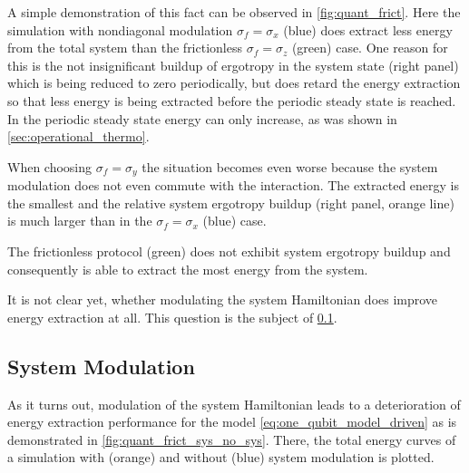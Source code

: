 A simple demonstration of this fact can be observed in
\cref{fig:quant_frict}. Here the simulation with nondiagonal
modulation \(σ_{f}=σ_{x}\) (blue) does extract less energy from the
total system than the frictionless \(σ_{f}=σ_{z}\) (green) case. One
reason for this is the not insignificant buildup of ergotropy in the
system state (right panel) which is being reduced to zero
periodically, but does retard the energy extraction so that less
energy is being extracted before the periodic steady state is
reached. In the periodic steady state energy can only increase, as was
shown in \cref{sec:operational_thermo}.

When choosing \(σ_{f}=σ_{y}\) the situation becomes even worse because
the system modulation does not even commute with the interaction. The
extracted energy is the smallest and the relative system ergotropy
buildup (right panel, orange line) is much larger than in the
\(σ_{f}=σ_{x}\) (blue) case.

The frictionless protocol (green) does not exhibit system ergotropy
buildup and consequently is able to extract the most energy from the
system.

It is not clear yet, whether modulating the system Hamiltonian does
improve energy extraction at all. This question is the subject of
\cref{sec:sys_mod_v_no_sys_mod}.

\subsection{System Modulation}
\label{sec:sys_mod_v_no_sys_mod}
As it turns out, modulation of the system Hamiltonian leads to a
deterioration of energy extraction performance for the model
\cref{eq:one_qubit_model_driven} as is demonstrated in
\cref{fig:quant_frict_sys_no_sys}. There, the total energy curves of a
simulation with (orange) and without (blue) system modulation is
plotted.

